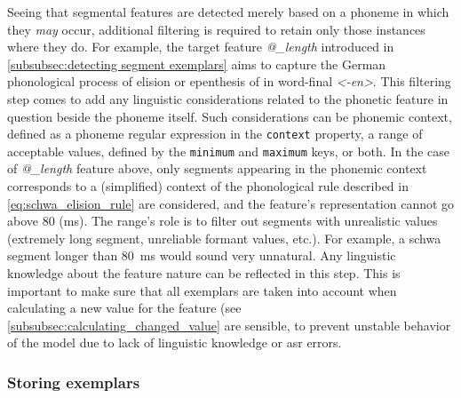 Seeing that segmental features are detected merely based on a phoneme in which they \emph{may} occur, additional filtering is required to retain only those instances where they do.
For example, the target feature \emph{@\_length} introduced in \cref{subsubsec:detecting segment exemplars} aims to capture the German phonological process of elision or epenthesis of  in word-final \emph{<-en>}.
%
%
%
This filtering step comes to add any linguistic considerations related to the phonetic feature in question beside the phoneme itself.
Such considerations can be phonemic context, defined as a phoneme regular expression in the \texttt{context} property, a range of acceptable values, defined by the \texttt{minimum} and \texttt{maximum} keys, or both.
In the case of \emph{@\_length} feature above, only segments appearing in the phonemic context corresponds to a (simplified) context of the phonological rule described in \cref{eq:schwa_elision_rule} are considered, and the feature's representation cannot go above 80 (\si{\milli\second}).
The range's role is to filter out segments with unrealistic values (extremely long segment, unreliable formant values, etc.).
For example, a schwa segment longer than \SI{80}{\milli\second} would sound very unnatural.
Any linguistic knowledge about the feature nature can be reflected in this step.
This is important to make sure that all exemplars are taken into account when calculating a new value for the feature (see \cref{subsubsec:calculating_changed_value} are sensible, to prevent unstable behavior of the model due to lack of linguistic knowledge or \ac{asr} errors.

\subsubsection{Storing exemplars}
\label{subsubsec:collecting_exemplars}


